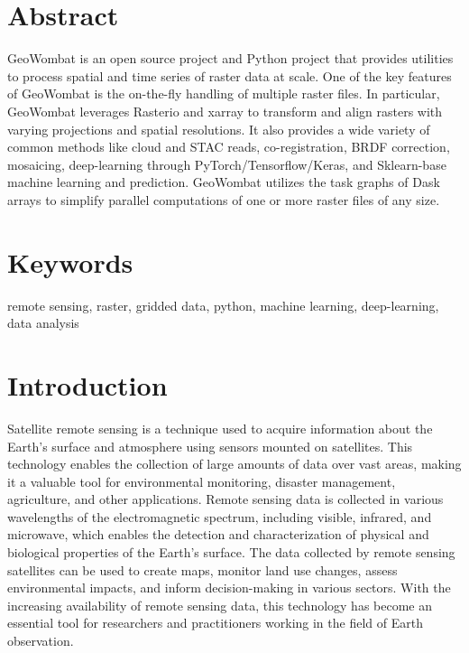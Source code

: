 \documentclass{jors}
\begin{document}
\section*{Abstract}


GeoWombat is an open source project and Python project that provides utilities to process spatial and time series of raster data at scale. One of the key features of GeoWombat is the on-the-fly handling of multiple raster files. In particular, GeoWombat leverages Rasterio and xarray to transform and align rasters with varying projections and spatial resolutions. It also provides a wide variety of common methods like cloud and STAC reads, co-registration, BRDF correction, mosaicing, deep-learning through PyTorch/Tensorflow/Keras, and Sklearn-base machine learning and prediction. GeoWombat utilizes the task graphs of Dask arrays to simplify parallel computations of one or more raster files of any size. 

\section*{Keywords}
remote sensing, raster, gridded data, python, machine learning, deep-learning, data analysis


\section*{Introduction}

Satellite remote sensing is a technique used to acquire information about the Earth's surface and atmosphere using sensors mounted on satellites. This technology enables the collection of large amounts of data over vast areas, making it a valuable tool for environmental monitoring, disaster management, agriculture, and other applications. Remote sensing data is collected in various wavelengths of the electromagnetic spectrum, including visible, infrared, and microwave, which enables the detection and characterization of physical and biological properties of the Earth's surface. The data collected by remote sensing satellites can be used to create maps, monitor land use changes, assess environmental impacts, and inform decision-making in various sectors. With the increasing availability of remote sensing data, this technology has become an essential tool for researchers and practitioners working in the field of Earth observation.\newline
\end{document}
